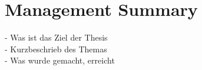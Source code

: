\chapter*{Management Summary}
\label{chap:managementSummary}

- Was ist das Ziel der Thesis \\
- Kurzbeschrieb des Themas \\
- Was wurde gemacht, erreicht \\